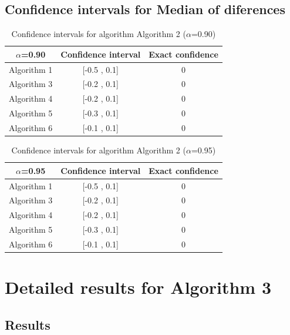 \documentclass[a4paper,10pt]{article}
\begin{document}
\subsection{Confidence intervals for Median of diferences}

\begin{table}[!htp]
\centering\small
\begin{tabular}{
|c|c|c|}
\hline
 $\alpha$=0.90 & Confidence interval & Exact confidence \\ \hline 
Algorithm 1 & [-0.5 , 0.1] & 0\\ \hline 
Algorithm 3 & [-0.2 , 0.1] & 0\\ \hline 
Algorithm 4 & [-0.2 , 0.1] & 0\\ \hline 
Algorithm 5 & [-0.3 , 0.1] & 0\\ \hline 
Algorithm 6 & [-0.1 , 0.1] & 0\\ \hline 

\end{tabular}
\caption{Confidence intervals for algorithm Algorithm 2 ($\alpha$=0.90)}
\end{table}
\begin{table}[!htp]
\centering\small
\begin{tabular}{
|c|c|c|}
\hline
 $\alpha$=0.95 & Confidence interval & Exact confidence \\ \hline 
Algorithm 1 & [-0.5 , 0.1] & 0\\ \hline 
Algorithm 3 & [-0.2 , 0.1] & 0\\ \hline 
Algorithm 4 & [-0.2 , 0.1] & 0\\ \hline 
Algorithm 5 & [-0.3 , 0.1] & 0\\ \hline 
Algorithm 6 & [-0.1 , 0.1] & 0\\ \hline 

\end{tabular}
\caption{Confidence intervals for algorithm Algorithm 2 ($\alpha$=0.95)}
\end{table}

 \clearpage 


\section{Detailed results for Algorithm 3}


\subsection{Results}
\end{document}
